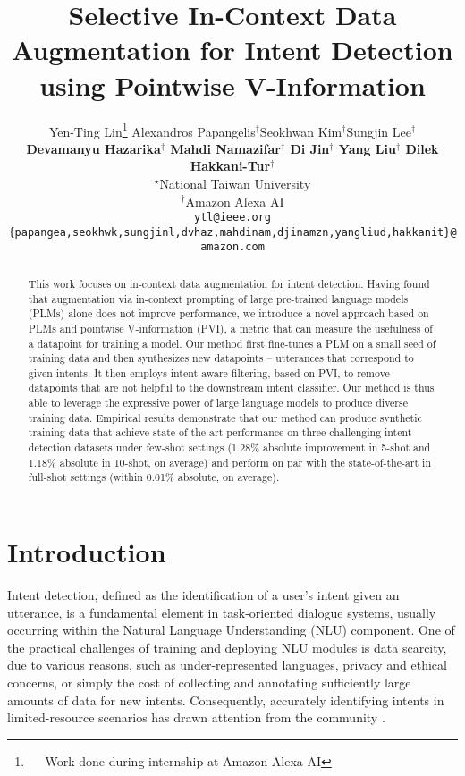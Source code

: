 \documentclass[11pt]{article}
\title{Selective In-Context Data Augmentation for Intent Detection using Pointwise V-Information}
\author{
Yen-Ting Lin\thanks{~~ Work done during internship at Amazon Alexa AI} \quad Alexandros Papangelis$^\dag$\quad Seokhwan Kim$^\dag$\quad Sungjin Lee$^\dag$ \\
\textbf{Devamanyu Hazarika$^\dag$ \quad Mahdi Namazifar$^\dag$ \quad Di Jin$^\dag$ \quad Yang Liu$^\dag$ \quad Dilek Hakkani-Tur$^\dag$}\\
  $^\star$National Taiwan University \\
  $^\dag$Amazon Alexa AI \\
  \small\texttt{ytl@ieee.org} \quad  \texttt{\{papangea,seokhwk,sungjinl,dvhaz,mahdinam,djinamzn,yangliud,hakkanit\}@amazon.com} \\
}
\begin{document}
\maketitle
\begin{abstract}
This work focuses on in-context data augmentation for intent detection. Having found that augmentation via in-context prompting of large pre-trained language models (PLMs) alone does not improve performance, we introduce a novel approach based on PLMs and pointwise V-information (PVI), a metric that can measure the usefulness of a datapoint for training a model.
Our method first fine-tunes a PLM on a small seed of training data and then synthesizes new datapoints -- utterances that correspond to given intents.
It then employs intent-aware filtering, based on PVI, to remove datapoints that are not helpful to the downstream intent classifier. Our method is thus able to leverage the expressive power of large language models to produce diverse training data. 
Empirical results demonstrate that our method can produce synthetic training data that achieve state-of-the-art performance on three challenging intent detection datasets under few-shot settings (1.28\% absolute improvement in 5-shot and 1.18\% absolute in 10-shot, on average) and perform on par with the state-of-the-art in full-shot settings (within 0.01\% absolute, on average).
\end{abstract}

\section{Introduction}
Intent detection, defined as the identification of a user's intent given an utterance, is a fundamental element in task-oriented dialogue systems, usually occurring within the Natural Language Understanding (NLU) component.
One of the practical challenges of training and deploying NLU modules is data scarcity, due to various reasons, such as under-represented languages, privacy and ethical concerns, or simply the cost of collecting and annotating sufficiently large amounts of data for new intents. 
Consequently, accurately identifying intents in limited-resource scenarios has drawn attention from the community \cite[for example]{papangelis-etal-2021-generative,mehri-eric-2021-example,zhang-etal-2021-shot}. 
\end{document}
